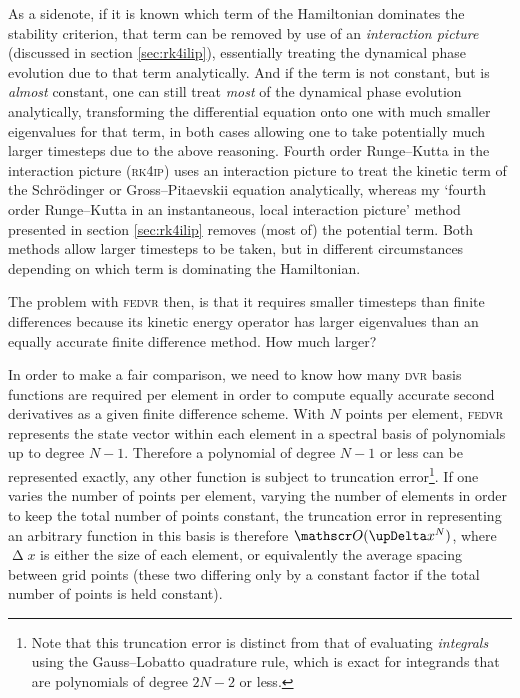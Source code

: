 As a sidenote, if it is known which term of the Hamiltonian dominates the stability criterion, that term can be removed by use of an \emph{interaction picture} (discussed in section \ref{sec:rk4ilip}), essentially treating the dynamical phase evolution due to that term analytically. And if the term is not constant, but is \emph{almost} constant, one can still treat \emph{most} of the dynamical phase evolution analytically, transforming the differential equation onto one with much smaller eigenvalues for that term, in both cases allowing one to take potentially much larger timesteps due to the above reasoning. Fourth order Runge--Kutta in the interaction picture (\textsc{rk4ip}) \cite{caradoc_davies_thesis} uses an interaction picture to treat the kinetic term of the Schr\"odinger or Gross--Pitaevskii equation analytically, whereas my `fourth order Runge--Kutta in an instantaneous, local interaction picture' method presented in section \ref{sec:rk4ilip} removes (most of) the potential term. Both methods allow larger timesteps to be taken, but in different circumstances depending on which term is dominating the Hamiltonian.

The problem with \textsc{fedvr} then, is that it requires smaller timesteps than finite differences because its kinetic energy operator has larger eigenvalues than an equally accurate finite difference method. How much larger?

In order to make a fair comparison, we need to know how many \textsc{dvr} basis functions are required per element in order to compute equally accurate second derivatives as a given finite difference scheme. With $N$ points per element, \textsc{fedvr} represents the state vector within each element in a spectral basis of polynomials up to degree $N - 1$. Therefore a polynomial of degree $N - 1$ or less can be represented exactly, any other function is subject to truncation error\footnote{Note that this truncation error is distinct from that of evaluating \emph{integrals} using the Gauss--Lobatto quadrature rule, which is exact for integrands that are polynomials of degree $2N - 2$ or less.}. If one varies the number of points per element, varying the number of elements in order to keep the total number of points constant, the truncation error in representing an arbitrary function in this basis is therefore $\Ord{\upDelta x^N}$, where $\upDelta x$ is either the size of each element, or equivalently the average spacing between grid points (these two differing only by a constant factor if the total number of points is held constant).

